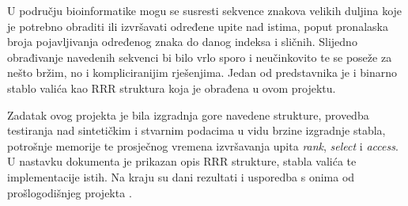 U području bioinformatike mogu se susresti sekvence znakova velikih duljina koje je potrebno obraditi ili izvršavati određene upite nad istima, poput pronalaska broja pojavljivanja određenog znaka do danog indeksa i sličnih. Slijedno obrađivanje navedenih sekvenci bi bilo vrlo sporo i neučinkovito te se poseže za nešto bržim, no i kompliciranijim rješenjima. Jedan od predstavnika je i binarno stablo valića kao RRR struktura koja je obrađena u ovom projektu.

Zadatak ovog projekta je bila izgradnja gore navedene strukture, provedba testiranja nad sintetičkim i stvarnim podacima u vidu brzine izgradnje stabla, potrošnje memorije te prosječnog vremena izvršavanja upita \emph{rank}, \emph{select} i \emph{access}. U nastavku dokumenta je prikazan opis RRR strukture, stabla valića te implementacije istih. Na kraju su dani rezultati i usporedba s onima od prošlogodišnjeg projekta \cite{breberic}.
